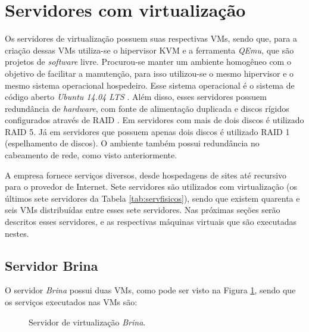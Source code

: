 \section{Servidores com virtualização}
\label{section:servvirt}

Os servidores de virtualização possuem suas respectivas \acp{VM}, sendo que, para a criação dessas \acp{VM} utiliza-se o hipervisor \ac{KVM} 
\cite{kvm} e a ferramenta \textit{QEmu}, que são projetos de \textit{software} livre. Procurou-se manter um ambiente homogêneo com o objetivo de 
facilitar a manutenção, para isso utilizou-se o mesmo hipervisor e o mesmo sistema operacional hospedeiro. Esse sistema operacional é o sistema 
de código aberto \textit{Ubuntu 14.04 \ac{LTS}} \cite{ubuntu}. Além disso, esses servidores possuem redundância de \textit{hardware}, com fonte 
de alimentação duplicada e discos rígidos configurados através de \ac{RAID} \cite{tanenbaum2009sistemas}. Em servidores com mais de dois discos é
utilizado \ac{RAID} 5. Já em servidores que possuem apenas dois discos é utilizado \ac{RAID} 1 (espelhamento de discos). 
O ambiente também possui redundância no cabeamento de rede, como visto anteriormente.

A empresa fornece serviços diversos, desde hospedagens de sites até  recursivo para o provedor de Internet. Sete servidores 
são utilizados com virtualização (os últimos sete servidores da Tabela \ref{tab:servfisicos}), sendo que existem quarenta e seis \acp{VM} 
distribuídas entre esses sete servidores. Nas próximas seções serão descritos esses servidores, e as respectivas máquinas virtuais que são
executadas nestes.

\subsection{Servidor Brina}
\label{section:serv_brina}

O servidor \textit{Brina} possui duas \acp{VM}, como pode ser visto na Figura \ref{fig:servidor_brina}, sendo que os serviços executados nas 
\acp{VM} são:

\begin{figure}[h!]
 \centering
 \caption{Servidor de virtualização \textit{Brina}.}
 \label{fig:servidor_brina}
\end{figure}

